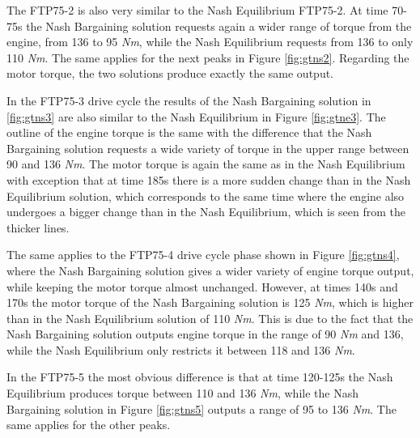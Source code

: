 The FTP75-2 is also very similar to the Nash Equilibrium FTP75-2. At time 70-75s the Nash Bargaining solution requests again a wider range of torque from the engine, from 136 to 95 \textit{Nm}, while the Nash Equilibrium requests from 136 to only 110 \textit{Nm}. The same applies for the next peaks in Figure \ref{fig:gtns2}. Regarding the motor torque, the two solutions produce exactly the same output.

In the FTP75-3 drive cycle the results of the Nash Bargaining solution in \ref{fig:gtns3} are also similar to the Nash Equilibrium in Figure \ref{fig:gtne3}. The outline of the engine torque is the same with the difference that the Nash Bargaining solution requests a wide variety of torque in the upper range between 90 and 136 \textit{Nm}. The motor torque is again the same as in the Nash Equilibrium with exception that at time 185s there is a more sudden change than in the Nash Equilibrium solution, which corresponds  to the same time where the engine also undergoes a bigger change than in the Nash Equilibrium, which is seen from the thicker lines.

The same applies to the FTP75-4 drive cycle phase shown in Figure \ref{fig:gtns4}, where the Nash Bargaining solution gives a wider variety of engine torque output, while keeping the motor torque almost unchanged. However, at times 140s and 170s the motor torque of the Nash Bargaining solution is 125 \textit{Nm}, which is higher than in the Nash Equilibrium solution of 110 \textit{Nm}. This is due to the fact that the Nash Bargaining solution outputs engine torque in the range of 90 \textit{Nm} and 136, while the Nash Equilibrium only restricts it between 118 and 136 \textit{Nm}.

In the FTP75-5 the most obvious difference is that at time 120-125s the Nash Equilibrium produces torque between 110 and 136 \textit{Nm}, while the Nash Bargaining solution in Figure \ref{fig:gtns5} outputs a range of 95 to 136 \textit{Nm}. The same applies for the other peaks.

